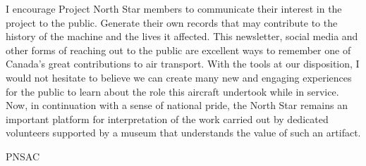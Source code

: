 I encourage Project North Star members to communicate their interest in the
project to the public. Generate their own records that may contribute to the
history of the machine and the lives it affected. This newsletter, social media
and other forms of reaching out to the public are excellent ways to remember
one of Canada’s great contributions to air transport. With the tools at our
disposition, I would not hesitate to believe we can create many new and
engaging experiences for the public to learn about the role this aircraft
undertook while in service. Now, in continuation with a sense of national
pride, the North Star remains an important platform for interpretation of the
work carried out by dedicated volunteers supported by a museum that understands
the value of such an artifact. 

\begin{footnotesize}
  \raggedleft PNSAC\\
\end{footnotesize}



